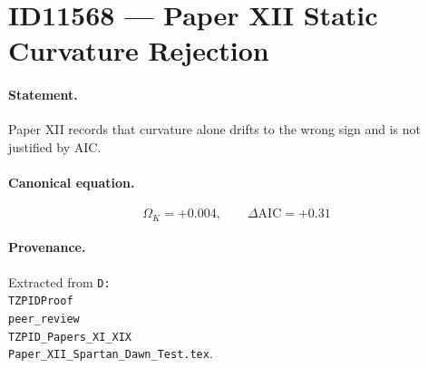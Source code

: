 \section*{ID11568 --- Paper XII Static Curvature Rejection}

\paragraph{Statement.}
Paper XII records that curvature alone drifts to the wrong sign and is not justified by AIC.

\paragraph{Canonical equation.}
\[
\Omega_K=+0.004,\qquad\Delta\mathrm{AIC}=+0.31
\]

\paragraph{Provenance.}
Extracted from \texttt{D:\\TZPIDProof\\peer\_review\\TZPID\_Papers\_XI\_XIX\\Paper\_XII\_Spartan\_Dawn\_Test.tex}.
